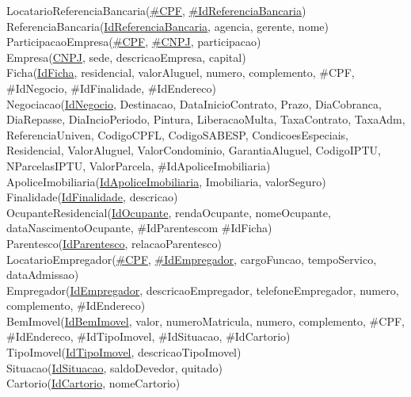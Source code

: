 \documentclass{article}
\begin{document}
        LocatarioReferenciaBancaria(\underline{\#CPF}, \underline{\#IdReferenciaBancaria})
        \\
        ReferenciaBancaria(\underline{IdReferenciaBancaria}, agencia, gerente, nome)
        \\
        ParticipacaoEmpresa(\underline{\#CPF}, \underline{\#CNPJ}, participacao)
        \\
        Empresa(\underline{CNPJ}, sede, descricaoEmpresa, capital)
        \\
        Ficha(\underline{IdFicha}, residencial, valorAluguel, numero, complemento, \#CPF, \#IdNegocio, \#IdFinalidade, \#IdEndereco)
        \\
        Negociacao(\underline{IdNegocio}, Destinacao, DataInicioContrato, Prazo, DiaCobranca, DiaRepasse, DiaIncioPeriodo, Pintura, LiberacaoMulta, TaxaContrato, TaxaAdm, ReferenciaUniven, CodigoCPFL, CodigoSABESP, CondicoesEspeciais, Residencial, ValorAluguel, ValorCondominio, GarantiaAluguel, CodigoIPTU, NParcelasIPTU, ValorParcela, \#IdApoliceImobiliaria)
        \\
        ApoliceImobiliaria(\underline{IdApoliceImobiliaria}, Imobiliaria, valorSeguro)
        \\
        Finalidade(\underline{IdFinalidade}, descricao)
        \\
        OcupanteResidencial(\underline{IdOcupante}, rendaOcupante, nomeOcupante, dataNascimentoOcupante, \#IdParentescom \#IdFicha)
        \\
        Parentesco(\underline{IdParentesco}, relacaoParentesco)
        \\
        LocatarioEmpregador(\underline{\#CPF}, \underline{\#IdEmpregador}, cargoFuncao, tempoServico, dataAdmissao)
        \\
        Empregador(\underline{IdEmpregador}, descricaoEmpregador, telefoneEmpregador, numero, complemento, \#IdEndereco)
        \\
        BemImovel(\underline{IdBemImovel}, valor, numeroMatricula, numero, complemento, \#CPF, \#IdEndereco, \#IdTipoImovel, \#IdSituacao, \#IdCartorio)
        \\
        TipoImovel(\underline{IdTipoImovel}, descricaoTipoImovel)
        \\
        Situacao(\underline{IdSituacao}, saldoDevedor, quitado)
        \\
        Cartorio(\underline{IdCartorio}, nomeCartorio) 
        
        \pagebreak
\end{document}
